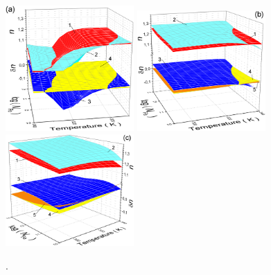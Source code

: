 \documentclass[12pt]{article}
\begin{document}
\begin{figure}
\includegraphics[width=4.9cm]{FigB105d15} \hfill
\includegraphics[width=4.9cm]{FigB106d15} \hfill
\includegraphics[width=4.9cm]{FigB107d15}
\caption{.
}
\label{FigTNfe}
\end{figure}
\end{document}
